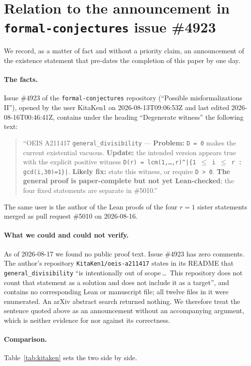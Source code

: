 \documentclass[11pt]{article}
\theoremstyle{plain}
\theoremstyle{definition}
\theoremstyle{remark}
\numberwithin{equation}{section}
\begin{document}
\section{Relation to the announcement in \texttt{formal-conjectures} issue \#4923}
\label{sec:priority}

We record, as a matter of fact and without a priority claim, an announcement of the existence
statement that pre-dates the completion of this paper by one day.

\paragraph{The facts.} Issue \#4923 of the \texttt{formal-conjectures} repository
(``Possible misformalizations II''), opened by the user KitaKen1 on 2026-08-13T09:06:53Z and last
edited 2026-08-16T00:46:41Z, contains under the heading ``Degenerate witness'' the following
text:
\begin{quote}\small
``OEIS A211417 \texttt{general\_divisibility} --- \textbf{Problem:} \texttt{D = 0} makes the
current existential vacuous. \textbf{Update:} the intended version appears true with the explicit
positive witness \texttt{D(r) = lcm(1,\dots,r)\^{}|\{1 $\le$ i $\le$ r : gcd(i,30)=1\}|}.
\textbf{Likely fix:} state this witness, or require \texttt{D > 0}. \textbf{The general proof is
paper-complete but not yet Lean-checked}; the four fixed statements are separate in \#5010.''
\end{quote}
The same user is the author of the Lean proofs of the four $r=1$ sister statements merged as pull
request \#5010 on 2026-08-16.

\paragraph{What we could and could not verify.} As of 2026-08-17 we found no public proof text.
Issue \#4923 has zero comments. The author's repository \texttt{KitaKen1/oeis-a211417} states in
its README that \texttt{general\_divisibility} ``is intentionally out of scope\,\dots\ This
repository does not count that statement as a solution and does not include it as a target'', and
contains no corresponding Lean or manuscript file; all twelve files in it were enumerated. An
arXiv abstract search returned nothing. We therefore treat the sentence quoted above as an
announcement without an accompanying argument, which is neither evidence for nor against its
correctness.

\paragraph{Comparison.} Table~\ref{tab:kitaken} sets the two side by side.
\end{document}

